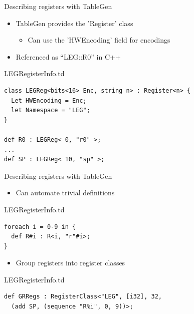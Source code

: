 
\begin{frame}[fragile]{Describing registers with TableGen}

\begin{itemize}
    \item TableGen provides the 'Register' class
    \begin{itemize}
        \item Can use the 'HWEncoding' field for encodings
    \end{itemize}
    \item Referenced as “LEG::R0” in C++
\end{itemize}

\begin{block}{LEGRegisterInfo.td}
\begin{lstlisting}
class LEGReg<bits<16> Enc, string n> : Register<n> {
  Let HWEncoding = Enc;
  let Namespace = "LEG";
}

def R0 : LEGReg< 0, "r0" >;
...
def SP : LEGReg< 10, "sp" >;
\end{lstlisting}
\end{block}

\end{frame}


\begin{frame}[fragile]{Describing registers with TableGen}

\begin{itemize}
    \item Can automate trivial definitions
\end{itemize}

\begin{block}{LEGRegisterInfo.td}
\begin{lstlisting}
foreach i = 0-9 in {
  def R#i : R<i, "r"#i>;
}
\end{lstlisting}
\end{block}

\begin{itemize}
    \item Group registers into register classes
\end{itemize}

\begin{block}{LEGRegisterInfo.td}
\begin{lstlisting}
def GRRegs : RegisterClass<"LEG", [i32], 32,
  (add SP, (sequence "R%i", 0, 9))>;
\end{lstlisting}
\end{block}

\end{frame}

